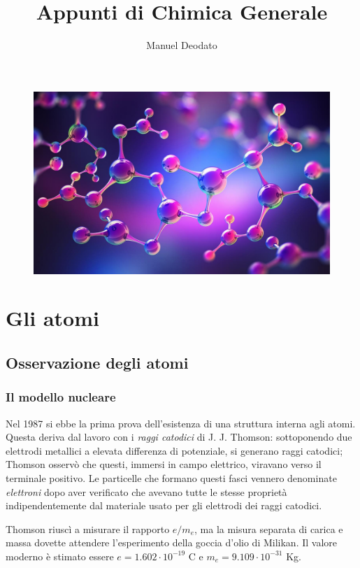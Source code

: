 \documentclass[11pt, a4paper]{scrartcl} %
\title{Appunti di Chimica Generale}
\author{Manuel Deodato}
\date{}
\renewcommand{\maketitle}{
\begin{center}
{\sffamily
{\fontsize{20}{20}\selectfont\MakeUppercase\thetitle}}

\vspace{0.2in}

{\large\scshape\sffamily\theauthor}
\end{center}
}
\numberwithin{equation}{subsection}
\theoremstyle{style2}
\theoremstyle{style1}
\begin{document}
\maketitle
\vspace{9cm}
\begin{figure}[h!]
	\centering
	\includegraphics[width=1\columnwidth]{front.jpg}
\end{figure}

\newpage
\tableofcontents 
\newpage
\section{Gli atomi}
\subsection{Osservazione degli atomi}


\subsubsection{Il modello nucleare}
Nel 1987 si ebbe la prima prova dell'esistenza di una struttura interna agli atomi.
Questa deriva dal lavoro con i \textit{raggi catodici} di J. J. Thomson: sottoponendo due elettrodi metallici a elevata differenza di potenziale, si generano raggi catodici; Thomson osserv\`o che questi, immersi in campo elettrico, viravano verso il terminale positivo.
Le particelle che formano questi fasci vennero denominate \textit{elettroni} dopo aver verificato che avevano tutte le stesse propriet\`a indipendentemente dal materiale usato per gli elettrodi dei raggi catodici.

Thomson riusc\`i a misurare il rapporto $e / m_e$, ma la misura separata di carica e massa dovette attendere l'esperimento della goccia d'olio di Milikan. 
Il valore moderno \`e stimato essere $e = 1.602 \cdot  10^{-19} $ C e $m_e = 9.109 \cdot  10^{-31} $ Kg.
\end{document}
